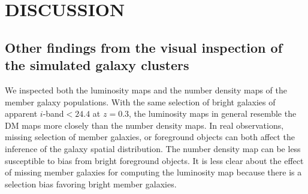  
 
\section{DISCUSSION}\label{sec:discussion}

\subsection{Other findings from the visual inspection of the simulated galaxy clusters}
We inspected both the luminosity maps and the
number density maps of the member galaxy populations.
With the same selection of bright galaxies of apparent $i$-band$ < 24.4$ at
$z=0.3$, the luminosity maps in general resemble the DM maps more closely than 
the number density maps.
In real observations, missing selection of member galaxies, or 
foreground objects can both affect the inference of the galaxy spatial 
distribution. The number density map can be less susceptible to bias from bright 
foreground objects. It is less clear about the effect of missing member galaxies 
for computing the luminosity map because there is a selection bias favoring 
bright member galaxies.


% 
% 
% 
% 
% 
